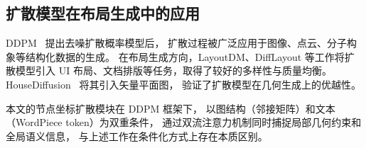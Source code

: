 \subsection{扩散模型在布局生成中的应用}
\label{subsec:diffusion_layout}

DDPM~\cite{ho2020ddpm} 提出去噪扩散概率模型后，
扩散过程被广泛应用于图像、点云、分子构象等结构化数据的生成。
在布局生成方向，LayoutDM、DiffLayout 等工作将扩散模型引入
UI 布局、文档排版等任务，取得了较好的多样性与质量均衡。
HouseDiffusion~\cite{shabani2023housediffusion} 将其引入矢量平面图，
验证了扩散模型在几何生成上的优越性。

本文的节点坐标扩散模块在 DDPM 框架下，
以图结构（邻接矩阵）和文本（WordPiece token）为双重条件，
通过双流注意力机制同时捕捉局部几何约束和全局语义信息，
与上述工作在条件化方式上存在本质区别。
